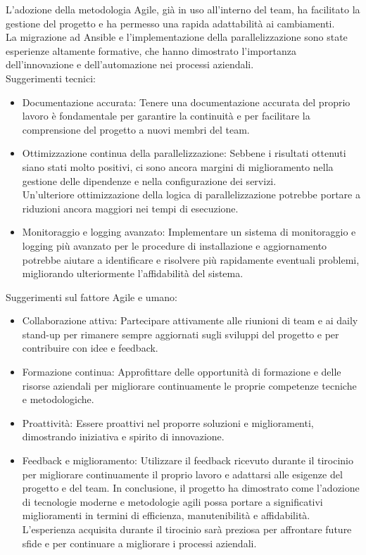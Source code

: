 L'adozione della metodologia Agile, già in uso all'interno del team, ha
facilitato la gestione del progetto e ha permesso una rapida adattabilità ai
cambiamenti.\\ La migrazione ad Ansible e l'implementazione della
parallelizzazione sono state esperienze altamente formative, che hanno dimostrato
l'importanza dell'innovazione e dell'automazione nei processi aziendali.\\ Suggerimenti
tecnici:
\begin{itemize}
  \item Documentazione accurata: Tenere una documentazione accurata del proprio
    lavoro è fondamentale per garantire la continuità e per facilitare la
    comprensione del progetto a nuovi membri del team.

  \item Ottimizzazione continua della parallelizzazione: Sebbene i risultati
    ottenuti siano stati molto positivi, ci sono ancora margini di miglioramento
    nella gestione delle dipendenze e nella configurazione dei servizi.\\ Un'ulteriore
    ottimizzazione della logica di parallelizzazione potrebbe portare a riduzioni
    ancora maggiori nei tempi di esecuzione.

  \item Monitoraggio e logging avanzato: Implementare un sistema di monitoraggio
    e logging più avanzato per le procedure di installazione e aggiornamento
    potrebbe aiutare a identificare e risolvere più rapidamente eventuali
    problemi, migliorando ulteriormente l'affidabilità del sistema.
\end{itemize}
Suggerimenti sul fattore Agile e umano:
\begin{itemize}
  \item Collaborazione attiva: Partecipare attivamente alle riunioni di team e
    ai daily stand-up per rimanere sempre aggiornati sugli sviluppi del progetto
    e per contribuire con idee e feedback.

  \item Formazione continua: Approfittare delle opportunità di formazione e
    delle risorse aziendali per migliorare continuamente le proprie competenze
    tecniche e metodologiche.

  \item Proattività: Essere proattivi nel proporre soluzioni e miglioramenti, dimostrando
    iniziativa e spirito di innovazione.

  \item Feedback e miglioramento: Utilizzare il feedback ricevuto durante il
    tirocinio per migliorare continuamente il proprio lavoro e adattarsi alle
    esigenze del progetto e del team. In conclusione, il progetto ha dimostrato
    come l'adozione di tecnologie moderne e metodologie agili possa portare a
    significativi miglioramenti in termini di efficienza, manutenibilità e affidabilità.\\
    L'esperienza acquisita durante il tirocinio sarà preziosa per affrontare future
    sfide e per continuare a migliorare i processi aziendali.
\end{itemize}
